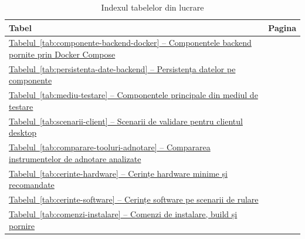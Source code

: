 \begin{table}[!htbp]
    \caption{Indexul tabelelor din lucrare}
    \centering
    \footnotesize
    \begin{tabular}{|p{}|p{}|}
        \hline
        Tabel & Pagina \\
        \hline
        \hyperref[tab:componente-backend-docker]{Tabelul~\ref*{tab:componente-backend-docker} -- Componentele backend pornite prin Docker Compose} &
        \pageref{tab:componente-backend-docker} \\
        \hline
        \hyperref[tab:persistenta-date-backend]{Tabelul~\ref*{tab:persistenta-date-backend} -- Persistența datelor pe componente} &
        \pageref{tab:persistenta-date-backend} \\
        \hline
        \hyperref[tab:mediu-testare]{Tabelul~\ref*{tab:mediu-testare} -- Componentele principale din mediul de testare} &
        \pageref{tab:mediu-testare} \\
        \hline
        \hyperref[tab:scenarii-client]{Tabelul~\ref*{tab:scenarii-client} -- Scenarii de validare pentru clientul desktop} &
        \pageref{tab:scenarii-client} \\
        \hline
        \hyperref[tab:comparare-tooluri-adnotare]{Tabelul~\ref*{tab:comparare-tooluri-adnotare} -- Compararea instrumentelor de adnotare analizate} &
        \pageref{tab:comparare-tooluri-adnotare} \\
        \hline
        \hyperref[tab:cerinte-hardware]{Tabelul~\ref*{tab:cerinte-hardware} -- Cerințe hardware minime și recomandate} &
        \pageref{tab:cerinte-hardware} \\
        \hline
        \hyperref[tab:cerinte-software]{Tabelul~\ref*{tab:cerinte-software} -- Cerințe software pe scenarii de rulare} &
        \pageref{tab:cerinte-software} \\
        \hline
        \hyperref[tab:comenzi-instalare]{Tabelul~\ref*{tab:comenzi-instalare} -- Comenzi de instalare, build și pornire} &
        \pageref{tab:comenzi-instalare} \\
        \hline
    \end{tabular}
    \label{tab:index-tabele}
\end{table}
